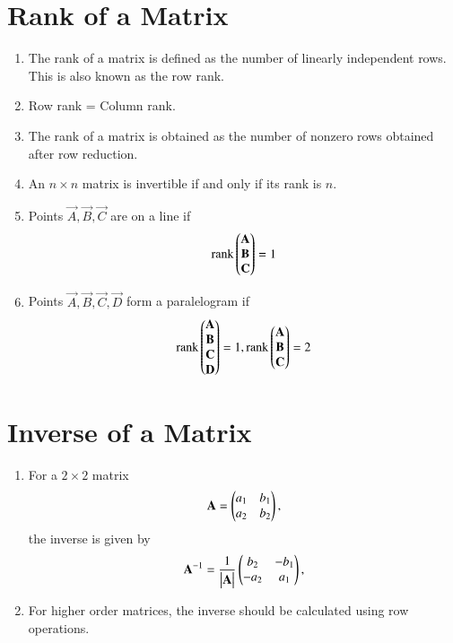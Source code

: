 \section{Rank of a Matrix}
\begin{enumerate}[label=\thesection.\arabic*.,ref=\thesection.\theenumi]
\item The rank of a matrix is defined as the number of linearly independent rows.  This is also known as the row rank.
\item Row rank = Column rank.
\item The rank of a matrix is obtained as the number of nonzero rows obtained after row reduction.
\item An $n \times n$ matrix is invertible if and only if its rank is $n$.

\item Points $\vec{A}, \vec{B}, \vec{C}$ are on a line if 
\begin{align}
  \text{rank}\begin{pmatrix}\mathbf{A} \\ \mathbf{B} \\ \mathbf{C} \end{pmatrix}  = 1
\end{align}
\item Points $\vec{A}, \vec{B}, \vec{C}, \vec{D}$ form a paralelogram if 
\begin{align}
  \text{rank}\begin{pmatrix}\mathbf{A} \\ \mathbf{B} \\ \mathbf{C} \\ \mathbf{D}  \end{pmatrix}  = 1, 
  \text{rank}\begin{pmatrix}\mathbf{A} \\ \mathbf{B} \\ \mathbf{C} \end{pmatrix}  = 2
\end{align}
\end{enumerate}
\section{Inverse of a Matrix}
\begin{enumerate}[label=\thesection.\arabic*.,ref=\thesection.\theenumi]
\item For a $2 \times 2$ matrix 
\begin{align}
	\mathbf{A} = \begin{pmatrix}a_1 & b_1  \\ a_2 & b_2 \end{pmatrix},
\end{align}
the inverse is given by 
\begin{align}
	\mathbf{A}^{-1} = \frac{1}{\begin{vmatrix}\mathbf{A}\end{vmatrix}}\begin{pmatrix}b_2 & -b_1  \\ -a_2 & a_1 \end{pmatrix},
\end{align}
\item For higher order matrices, the inverse should be calculated using row operations.
\end{enumerate}
